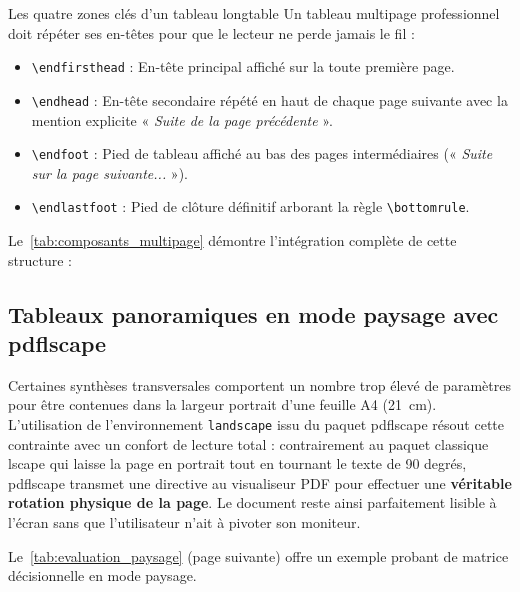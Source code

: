 \begin{boiteSynthese}{Les quatre zones clés d'un tableau \textsf{longtable}}
  Un tableau multipage professionnel doit répéter ses en-têtes pour que le lecteur ne perde jamais le fil :
  \begin{itemize}
    \item \texttt{\textbackslash endfirsthead} : En-tête principal affiché sur la toute première page.
    \item \texttt{\textbackslash endhead} : En-tête secondaire répété en haut de chaque page suivante avec la mention explicite « \textit{Suite de la page précédente} ».
    \item \texttt{\textbackslash endfoot} : Pied de tableau affiché au bas des pages intermédiaires (« \textit{Suite sur la page suivante...} »).
    \item \texttt{\textbackslash endlastfoot} : Pied de clôture définitif arborant la règle \texttt{\textbackslash bottomrule}.
  \end{itemize}
\end{boiteSynthese}

Le~\cref{tab:composants_multipage} démontre l'intégration complète de cette structure :



\subsection{Tableaux panoramiques en mode paysage avec \textsf{pdflscape}}
\label{subsec:mode_paysage}

Certaines synthèses transversales comportent un nombre trop élevé de paramètres pour être contenues dans la largeur portrait d'une feuille A4 (\qty{21}{\centi\meter}).
L'utilisation de l'environnement \texttt{landscape} issu du paquet \textsf{pdflscape} résout cette contrainte avec un confort de lecture total :
contrairement au paquet classique \textsf{lscape} qui laisse la page en portrait tout en tournant le texte de 90 degrés, \textsf{pdflscape} transmet une directive au visualiseur PDF pour effectuer une \textbf{véritable rotation physique de la page}.
Le document reste ainsi parfaitement lisible à l'écran sans que l'utilisateur n'ait à pivoter son moniteur.

Le~\cref{tab:evaluation_paysage} (page suivante) offre un exemple probant de matrice décisionnelle en mode paysage.



